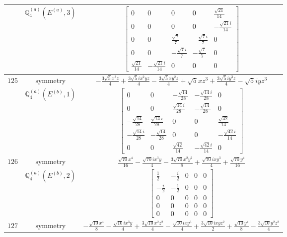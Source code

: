 \documentclass[fleqn,8pt,landscape]{jsarticle}
\begin{document}
\begin{longtable}{ccc}
$  $ & $ \mathbb{Q}_{4}^{(a)}(E^{(a)},3) $ & $ \begin{bmatrix} 0 & 0 & 0 & 0 & \frac{\sqrt{21}}{14} \\ 0 & 0 & 0 & 0 & - \frac{\sqrt{21} i}{14} \\ 0 & 0 & \frac{\sqrt{7}}{7} & - \frac{\sqrt{7} i}{7} & 0 \\ 0 & 0 & - \frac{\sqrt{7} i}{7} & - \frac{\sqrt{7}}{7} & 0 \\ \frac{\sqrt{21}}{14} & - \frac{\sqrt{21} i}{14} & 0 & 0 & 0 \end{bmatrix} $ \\ \hline
$ 125 $ & $ \text{symmetry} $ & $ - \frac{3 \sqrt{5} x^{3} z}{4} + \frac{3 \sqrt{5} i x^{2} y z}{4} - \frac{3 \sqrt{5} x y^{2} z}{4} + \sqrt{5} x z^{3} + \frac{3 \sqrt{5} i y^{3} z}{4} - \sqrt{5} i y z^{3} $ \\
$  $ & $ \mathbb{Q}_{4}^{(a)}(E^{(b)},1) $ & $ \begin{bmatrix} 0 & 0 & - \frac{\sqrt{14}}{28} & - \frac{\sqrt{14} i}{28} & 0 \\ 0 & 0 & \frac{\sqrt{14} i}{28} & - \frac{\sqrt{14}}{28} & 0 \\ - \frac{\sqrt{14}}{28} & \frac{\sqrt{14} i}{28} & 0 & 0 & \frac{\sqrt{42}}{14} \\ - \frac{\sqrt{14} i}{28} & - \frac{\sqrt{14}}{28} & 0 & 0 & - \frac{\sqrt{42} i}{14} \\ 0 & 0 & \frac{\sqrt{42}}{14} & - \frac{\sqrt{42} i}{14} & 0 \end{bmatrix} $ \\ \hline
$ 126 $ & $ \text{symmetry} $ & $ \frac{\sqrt{70} x^{4}}{16} - \frac{\sqrt{70} i x^{3} y}{4} - \frac{3 \sqrt{70} x^{2} y^{2}}{8} + \frac{\sqrt{70} i x y^{3}}{4} + \frac{\sqrt{70} y^{4}}{16} $ \\
$  $ & $ \mathbb{Q}_{4}^{(a)}(E^{(b)},2) $ & $ \begin{bmatrix} \frac{1}{2} & - \frac{i}{2} & 0 & 0 & 0 \\ - \frac{i}{2} & - \frac{1}{2} & 0 & 0 & 0 \\ 0 & 0 & 0 & 0 & 0 \\ 0 & 0 & 0 & 0 & 0 \\ 0 & 0 & 0 & 0 & 0 \end{bmatrix} $ \\ \hline
$ 127 $ & $ \text{symmetry} $ & $ - \frac{\sqrt{10} x^{4}}{8} - \frac{\sqrt{10} i x^{3} y}{4} + \frac{3 \sqrt{10} x^{2} z^{2}}{4} - \frac{\sqrt{10} i x y^{3}}{4} + \frac{3 \sqrt{10} i x y z^{2}}{2} + \frac{\sqrt{10} y^{4}}{8} - \frac{3 \sqrt{10} y^{2} z^{2}}{4} $ \\

\end{longtable}
\end{document}
